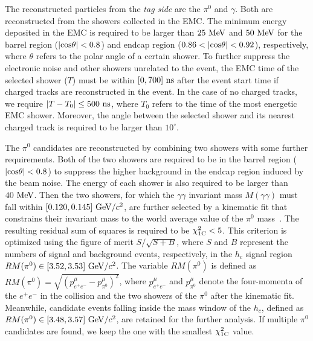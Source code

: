 \documentclass[twocolumn,showpacs,aps,prl]{revtex4-2}
\begin{document}
The reconstructed particles from the \textit{tag side} are the $\pi^0$ and $\gamma$.  Both are reconstructed from the showers collected in the EMC. The minimum energy deposited in the EMC is required to be larger than $25~{\rm MeV}$ and $50~{\rm MeV}$ for the barrel region ($|{\rm cos}\theta|<0.8$) and endcap region ($0.86<|{\rm cos}\theta|<0.92$), respectively, where $\theta$ refers to the polar angle of a certain shower. To further suppress the electronic noise and other showers unrelated to the event, the EMC time of the selected shower ($T$) must be within $[0, 700]~{\rm ns}$ after the event start time if charged tracks are reconstructed in the event. In the case of no charged tracks, we require $|T-T_0| \leq 500~{\rm ns}$, where $T_0$ refers to the time of the most energetic EMC shower. Moreover, the angle between the selected shower and its nearest charged track is required to be larger than $10^{\circ}$.

The $\pi^0$ candidates are reconstructed by combining two showers with some further requirements. Both of the two showers are required to be in the barrel region ($|{\rm cos}\theta|<0.8$) to suppress the higher background in the endcap region induced by the beam noise. The energy of each shower is also required to be larger than $40~{\rm MeV}$. Then the two showers, for which the $\gamma\gamma$ invariant mass $M(\gamma\gamma)$ must fall within $[0.120, 0.145]~{\rm GeV}/c^2$, are further selected by a kinematic fit that constrains their invariant mass to the world average value of the $\pi^0$ mass~\cite{ParticleDataGroup:2024cfk}.  The resulting residual sum of squares is required to be $\chi_{\rm 1C}^{2}<5$. This criterion is optimized using the figure of merit $S/\sqrt{S+B}$, where $S$ and $B$ represent the numbers of signal and background events, respectively, in the $h_c$ signal region
$RM(\pi^0) \in [3.52,3.53]~{\rm GeV}/c^2$. The variable $RM(\pi^0)$ is defined as
$RM(\pi^0) = \sqrt{({p}^\mu_{e^+ e^-} - {p}^\mu_{\pi^0})^{2}}$, where ${p}^\mu_{e^+ e^-}$ and ${p}^\mu_{\pi^0}$ denote the four-momenta of the $e^+ e^-$ in the collision and the two showers of the $\pi^0$ after the kinematic fit. Meanwhile, candidate events falling inside the mass window of
the $h_c$, defined as $RM(\pi^0) \in[3.48,3.57]~{\rm GeV}/c^2$, are retained for the further analysis.
If multiple $\pi^0$ candidates are found, we keep the one with the smallest $\chi_{\rm 1C}^{2}$ value.
\end{document}
